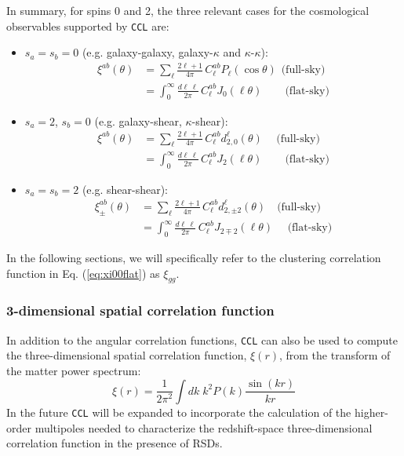 \documentclass[\docopts]{\docclass}
\newcommand{\ccl}{{\tt CCL}\xspace}
\begin{document}
In summary, for spins 0 and 2, the three relevant cases for the cosmological observables supported by \ccl are:
\begin{itemize}
  \item $s_a=s_b=0$ (e.g. galaxy-galaxy, galaxy-$\kappa$ and $\kappa$-$\kappa$):
    \begin{align}\label{eq:xi00full}
      \xi^{ab}(\theta)&=\sum_\ell\frac{2\ell+1}{4\pi}\,C^{ab}_\ell P_\ell(\cos\theta)\hspace{5pt}\text{(full-sky)}\\\label{eq:xi00flat}
                      &=\int_0^\infty\frac{d\ell\,\ell}{2\pi}\,C^{ab}_\ell J_0(\ell\theta)\hspace{25pt}\text{(flat-sky)}
    \end{align}
  \item $s_a=2$, $s_b=0$ (e.g. galaxy-shear, $\kappa$-shear):
    \begin{align}\label{eq:xi02full}
      \xi^{ab}(\theta)&=\sum_\ell\frac{2\ell+1}{4\pi}\,C^{ab}_\ell d^\ell_{2,0}(\theta)\hspace{15pt}\text{(full-sky)}\\\label{eq:xi02flat}
                      &=\int_0^\infty\frac{d\ell\,\ell}{2\pi}\,C^{ab}_\ell J_2(\ell\theta)\hspace{25pt}\text{(flat-sky)}
    \end{align}
  \item $s_a=s_b=2$ (e.g. shear-shear):
    \begin{align}\label{eq:xi22full}
      \xi^{ab}_\pm(\theta)&=\sum_\ell\frac{2\ell+1}{4\pi}\,C^{ab}_\ell d^\ell_{2,\pm2}(\theta)\hspace{12pt}\text{(full-sky)}\\\label{eq:xi22flat}
                      &=\int_0^\infty\frac{d\ell\,\ell}{2\pi}\,C^{ab}_\ell J_{2\mp2}(\ell\theta)\hspace{16pt}\text{(flat-sky)}
    \end{align}
\end{itemize}
In the following sections, we will specifically refer to the clustering correlation function in Eq. (\ref{eq:xi00flat}) as $\xi_{gg}$.

\subsubsection{3-dimensional spatial correlation function}
In addition to the angular correlation functions, \ccl can also be used to compute the three-dimensional spatial correlation function, $\xi(r)$, from the transform of the matter power spectrum:
\begin{equation}
\xi(r) = \frac{1}{2 \pi^2} \int dk \; k^2 P(k) \frac{\sin(kr)}{kr}
\label{eq:xi3d}
\end{equation}
In the future \ccl will be expanded to incorporate the calculation of the higher-order multipoles needed to characterize the redshift-space three-dimensional correlation function in the presence of RSDs.
\end{document}
